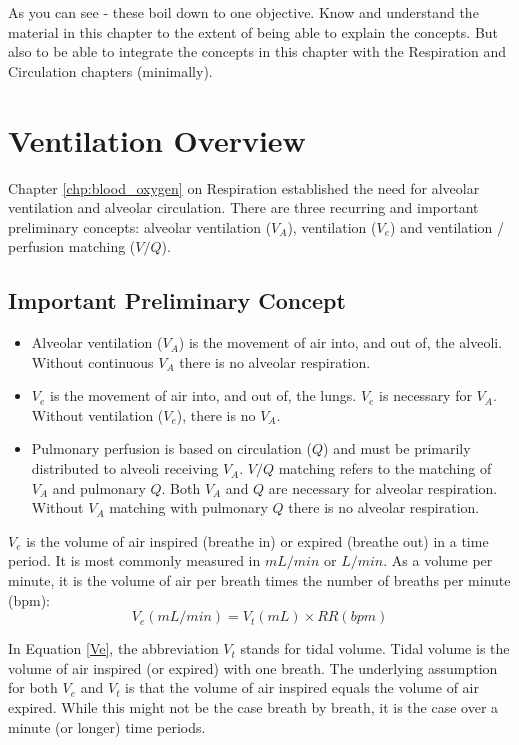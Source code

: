 As you can see - these boil down to one objective. Know and understand the material in this chapter to the extent of being able to explain the concepts. But also to be able to integrate the concepts in this chapter with the Respiration and Circulation chapters (minimally).

\section{Ventilation Overview}

Chapter \ref{chp:blood_oxygen} on Respiration established the need for alveolar ventilation and alveolar circulation. There are three recurring and important preliminary concepts: alveolar ventilation ($V_A$), ventilation ($V_e$) and ventilation / perfusion matching ($V/Q$).

\subsection{Important Preliminary Concept}

\begin{itemize}
    \item Alveolar ventilation ($V_A$) is the movement of air into, and out of, the alveoli. Without continuous $V_A$ there is no alveolar respiration. 
    \item $V_e$ is the movement of air into, and out of, the lungs. $V_e$ is necessary for $V_A$. Without ventilation ($V_e$), there is no $V_A$. \item Pulmonary perfusion is based on circulation ($Q$) and must be primarily distributed to alveoli receiving $V_A$. $V/Q$ matching refers to the matching of $V_A$ and pulmonary $Q$. Both $V_A$ and $Q$ are necessary for alveolar respiration. Without $V_A$ matching with pulmonary $Q$ there is no alveolar respiration.
 \end{itemize}

$V_e$ is the volume of air inspired (breathe in) or expired (breathe out) in a time period. It is most commonly measured in $mL/min$ or $L/min$. As a volume per minute, it is the volume of air per breath times the number of breaths per minute (bpm):
\vspace{3mm}
\begin{equation}
    V_e (mL/min) = V_t (mL) \times RR (bpm)
    \label{Ve}
\end{equation}
\vspace{3mm}

In Equation \ref{Ve}, the abbreviation $V_t$ stands for tidal volume. Tidal volume is the volume of air inspired (or expired) with one breath. The underlying assumption for both $V_e$ and $V_t$ is that the volume of air inspired equals the volume of air expired. While this might not be the case breath by breath, it is the case over a minute (or longer) time periods.\footnotemark{}

